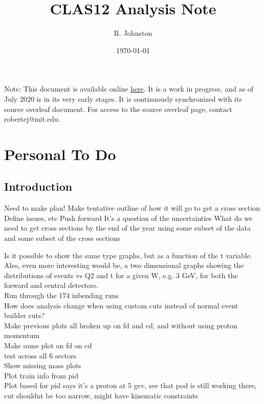 \documentclass[oneside]{book}
\title{CLAS12 \DVEP Analysis Note}
\author{R. Johnston}
\date{\today}
\begin{document}
\maketitle
Note: This document is available online \href{https://latexonline.cc/compile?git=https\%3A\%2F\%2Fgithub.com\%2Frobertej19\%2FClas12AnaNote&target=main.tex&command=pdflatex\&trackId=1593973491329}{here}. It is a work in progress, and as of July 2020 is in its very early stages. It is continuously synchronized with its source overleaf document. For access to the source overleaf page, contact robertej@mit.edu. 


\iffalse
\chapter{Personal To Do}


\section{Introduction}
Need to make plan!
Make tentative outline of how it will go to get a cross section
Define issues, etc
Push forward
It’s a question of the uncertainties 
What do we need to get cross sections by the end of the year using some subset of the data and some subset of the cross sections

Is it possible to show the same type graphs, but as a function of the t variable. Also, even more interesting would be, a two dimensional graphs  showing the distributions of events vs Q2 and t  for a given W, e.g. 3 GeV, for both the forward and central detectors.\\

Run through the 174 inbending runs\\

How does analysis change when using custom cuts instead of normal event builder cuts?\\


Make previous plots all broken up on fd and cd, and without using proton momentum\\

Make same plot on fd on cd \\
test across all 6 sectors\\
Show missing mass plots\\
Plot train info from pid\\

Plot based for pid says it's a proton at 5 gev, see that pod is still working there, cut shouldnt be too narrow, might have kinematic constraints\\
\end{document}
